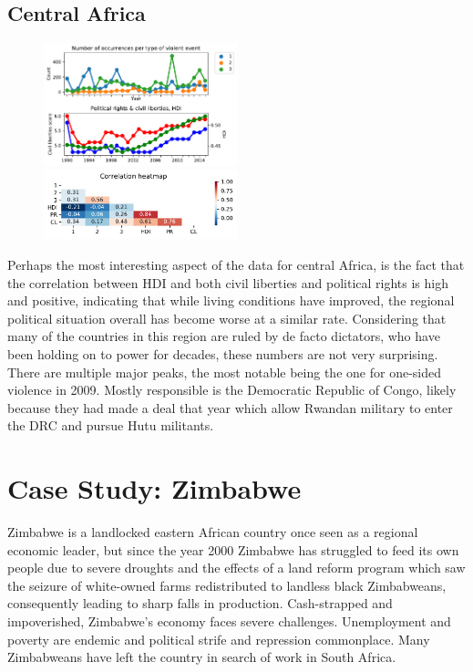 \documentclass[a4paper,11pt]{article}
\begin{document}
\subsection{Central Africa}
\begin{figure}[ht!]
    \includegraphics[width=0.50\textwidth]{images/ca.pdf}
    \includegraphics[width=0.50\textwidth]{images/ca_corr.pdf}
\end{figure}
Perhaps the most interesting aspect of the data for central Africa, is the fact that the correlation between HDI and both civil liberties and political rights is high and positive, indicating that while living conditions have improved, the regional political situation overall has become worse at a similar rate. Considering that many of the countries in this region are ruled by de facto dictators, who have been holding on to power for decades, these numbers are not very surprising.
There are multiple major peaks, the most notable being the one for one-sided violence in 2009. Mostly responsible is the Democratic Republic of Congo, likely because they had made a deal that year which allow Rwandan military to enter the DRC and pursue Hutu militants.

\section{Case Study: Zimbabwe}
Zimbabwe is a landlocked eastern African country once seen as a regional economic leader, but since the year 2000 Zimbabwe has struggled to feed its own people due to severe droughts and the effects of a land reform program which saw the seizure of white-owned farms redistributed to landless black Zimbabweans, consequently leading to sharp falls in production. Cash-strapped and impoverished, Zimbabwe's economy faces severe challenges. Unemployment and poverty are endemic and political strife and repression commonplace. Many Zimbabweans have left the country in search of work in South Africa.
\end{document}
